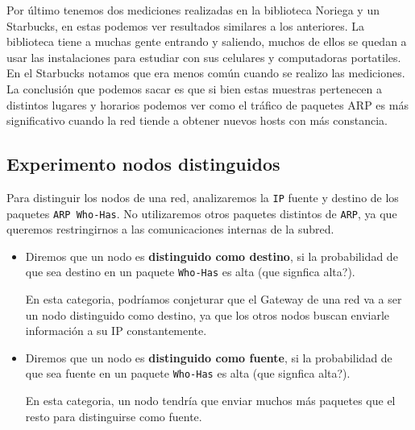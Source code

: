 Por último tenemos dos mediciones realizadas en la biblioteca Noriega y un Starbucks, en estas podemos ver resultados similares a los anteriores. La biblioteca tiene a muchas
gente entrando y saliendo, muchos de ellos se quedan a usar las instalaciones para estudiar con sus celulares y computadoras portatiles. En el Starbucks notamos que era menos
común cuando se realizo las mediciones.\\

La conclusión que podemos sacar es que si bien estas muestras pertenecen a distintos lugares y horarios podemos ver como el tráfico de paquetes ARP es más significativo cuando 
la red tiende a obtener nuevos hosts con más constancia.



\subsection{Experimento nodos distinguidos}

Para distinguir los nodos de una red, analizaremos la \texttt{IP} fuente y destino de los paquetes \texttt{ARP Who-Has}.
No utilizaremos otros paquetes distintos de \texttt{ARP}, ya que queremos restringirnos a las comunicaciones internas de la subred.

\begin{itemize}
    \item Diremos que un nodo es \textbf{distinguido como destino}, si la probabilidad de que sea destino en un paquete \texttt{Who-Has} es alta (que signfica alta?).

        En esta categoria, podríamos conjeturar que el Gateway de una red va a ser un nodo distinguido como destino,
        ya que los otros nodos buscan enviarle información a su IP constantemente.
    \item Diremos que un nodo es \textbf{distinguido como fuente}, si la probabilidad de que sea fuente en un paquete \texttt{Who-Has} es alta (que signfica alta?).

        En esta categoria, un nodo tendría que enviar muchos más paquetes que el resto para distinguirse como fuente.
\end{itemize}
